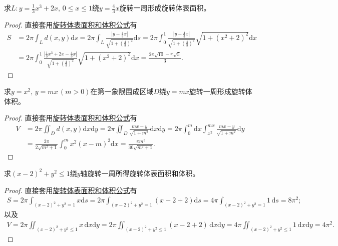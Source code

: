 \documentclass[../../main.tex]{subfiles}%
\begin{document}
\begin{example}
求$L:y=\frac{1}{3}x^3+2x,\,0\leqslant x\leqslant 1$绕$y=\frac{4}{3}x$旋转一周形成旋转体表面积。
\end{example}
\begin{proof}

直接套用\hyperref[theorem:旋转体表面积和体积公式]{旋转体表面积和体积公式}有
\begin{align*}
S &= 2\pi \int_L d(x,y)\mathrm{d}s = 2\pi \int_L \frac{\left|y-\frac{4}{3}x\right|}{\sqrt{1+\left(\frac{4}{3}\right)^2}}\mathrm{d}s = 2\pi \int_{0}^{1} \frac{\left|y-\frac{4}{3}x\right|}{\sqrt{1+\left(\frac{4}{3}\right)^2}}\sqrt{1+(x^2+2)^2}\mathrm{d}x \\
&= 2\pi \int_{0}^{1} \frac{\left|\frac{1}{3}x^3+2x-\frac{4}{3}x\right|}{\sqrt{1+\left(\frac{4}{3}\right)^2}}\sqrt{1+(x^2+2)^2}\mathrm{d}x = \frac{2\pi\sqrt{10}-\pi\sqrt{5}}{3}.
\end{align*}
\end{proof}

\begin{example}
求$y=x^2,\,y=mx\,(m>0)$在第一象限围成区域$D$绕$y=mx$旋转一周形成旋转体体积。
\end{example}
\begin{proof}

直接套用\hyperref[theorem:旋转体表面积和体积公式]{旋转体表面积和体积公式}有
\begin{align*}
V &= 2\pi \iint_D d(x,y)\mathrm{d}x\mathrm{d}y = 2\pi \iint_D \frac{mx-y}{\sqrt{1+m^2}}\mathrm{d}x\mathrm{d}y = 2\pi \int_{0}^{m}\mathrm{d}x \int_{x^2}^{mx} \frac{mx-y}{\sqrt{1+m^2}}\mathrm{d}y
\\
&= \frac{2\pi}{2\sqrt{m^2+1}} \int_{0}^{m} x^2(x-m)^2 \mathrm{d}x 
= \frac{\pi m^5}{30\sqrt{m^2+1}}.
\end{align*}
\end{proof}

\begin{example}
求$(x-2)^2+y^2 \leqslant 1$绕$y$轴旋转一周所得旋转体表面积和体积。
\end{example}
\begin{proof}

直接套用\hyperref[theorem:旋转体表面积和体积公式]{旋转体表面积和体积公式}有
\begin{align*}
S = 2\pi \int_{(x-2)^2+y^2=1} x\mathrm{d}s = 2\pi \int_{(x-2)^2+y^2=1} (x-2+2)\mathrm{d}s 
=4\pi \int_{(x-2)^2+y^2=1}1\,\mathrm{d}s=8\pi^2;
\end{align*}
以及
\begin{align*}
V = 2\pi \iint_{(x-2)^2+y^2\leqslant1}x\,\mathrm{d}x\mathrm{d}y
=2\pi \iint_{(x-2)^2+y^2\leqslant1}(x-2+2)\,\mathrm{d}x\mathrm{d}y 
=4\pi \iint_{(x-2)^2+y^2\leqslant1}1\,\mathrm{d}x\mathrm{d}y=4\pi^2.
\end{align*}
\end{proof}
\end{document}
